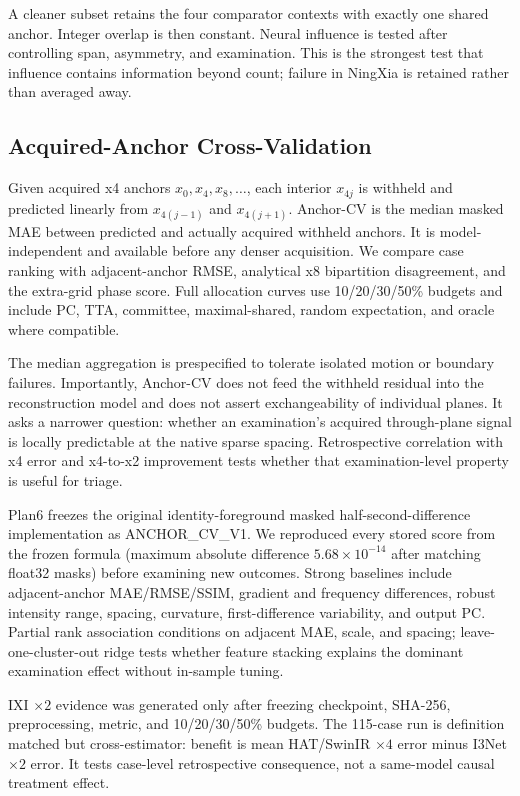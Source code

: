 \documentclass[10pt,twocolumn,letterpaper]{article}
\begin{document}
A cleaner subset retains the four comparator contexts with exactly one shared anchor. Integer overlap is then constant. Neural influence is tested after controlling span, asymmetry, and examination. This is the strongest test that influence contains information beyond count; failure in NingXia is retained rather than averaged away.

\subsection{Acquired-Anchor Cross-Validation}
Given acquired x4 anchors $x_0,x_4,x_8,\ldots$, each interior $x_{4j}$ is withheld and predicted linearly from $x_{4(j-1)}$ and $x_{4(j+1)}$. Anchor-CV is the median masked MAE between predicted and actually acquired withheld anchors. It is model-independent and available before any denser acquisition. We compare case ranking with adjacent-anchor RMSE, analytical x8 bipartition disagreement, and the extra-grid phase score. Full allocation curves use 10/20/30/50\% budgets and include PC, TTA, committee, maximal-shared, random expectation, and oracle where compatible.

The median aggregation is prespecified to tolerate isolated motion or boundary failures. Importantly, Anchor-CV does not feed the withheld residual into the reconstruction model and does not assert exchangeability of individual planes. It asks a narrower question: whether an examination's acquired through-plane signal is locally predictable at the native sparse spacing. Retrospective correlation with x4 error and x4-to-x2 improvement tests whether that examination-level property is useful for triage.

Plan6 freezes the original identity-foreground masked half-second-difference implementation as ANCHOR\_CV\_V1. We reproduced every stored score from the frozen formula (maximum absolute difference $5.68\times10^{-14}$ after matching float32 masks) before examining new outcomes. Strong baselines include adjacent-anchor MAE/RMSE/SSIM, gradient and frequency differences, robust intensity range, spacing, curvature, first-difference variability, and output PC. Partial rank association conditions on adjacent MAE, scale, and spacing; leave-one-cluster-out ridge tests whether feature stacking explains the dominant examination effect without in-sample tuning.

IXI $\times2$ evidence was generated only after freezing checkpoint, SHA-256, preprocessing, metric, and 10/20/30/50\% budgets. The 115-case run is definition matched but cross-estimator: benefit is mean HAT/SwinIR $\times4$ error minus I3Net $\times2$ error. It tests case-level retrospective consequence, not a same-model causal treatment effect.
\end{document}
